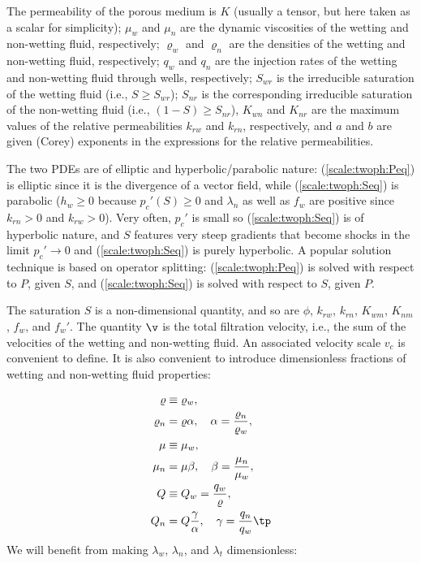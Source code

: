 \documentclass[graybox,envcountchap,sectrefs,final]{svmonodo}
\begin{document}
The permeability of the porous medium is $K$
(usually a tensor, but here taken as a
scalar for simplicity); $\mu_w$ and $\mu_n$ are the dynamic viscosities
of the wetting and non-wetting fluid, respectively;
$\varrho_w$ and $\varrho_n$ are the densities
of the wetting and non-wetting fluid, respectively;
$q_w$ and $q_n$ are the injection rates of the wetting and non-wetting
fluid through wells, respectively;
$S_{wr}$ is the irreducible saturation of
the wetting fluid (i.e., $S\geq S_{wr}$); $S_{nr}$ is the corresponding
irreducible saturation of the non-wetting fluid (i.e., $(1-S)\geq S_{nr}$),
$K_{wn}$ and $K_{nr}$ are the maximum values of the
relative permeabilities $k_{rw}$ and $k_{rn}$, respectively, and
$a$ and $b$ are given (Corey) exponents in the expressions for the
relative permeabilities.

The two PDEs are of elliptic and hyperbolic/parabolic nature:
(\ref{scale:twoph:Peq}) is elliptic since it is the divergence of a
vector field, while (\ref{scale:twoph:Seq}) is parabolic ($h_w\geq 0$
because $p_c'(S)\geq 0$ and $\lambda_n$ as well as $f_w$ are positive
since $k_{rn}>0$ and $k_{rw}>0$). Very often, $p_c'$ is small so
(\ref{scale:twoph:Seq}) is of hyperbolic nature, and $S$ features very
steep gradients that become shocks in the limit $p_c'\rightarrow 0$
and (\ref{scale:twoph:Seq}) is purely hyperbolic.
A popular solution technique is based on operator splitting:
(\ref{scale:twoph:Peq}) is solved with respect to $P$, given $S$, and
(\ref{scale:twoph:Seq}) is solved with respect to $S$, given $P$.

The saturation $S$ is a non-dimensional quantity, and so are $\phi$,
$k_{rw}$, $k_{rn}$, $K_{wm}$, $K_{nm}$, $f_w$, and $f_w'$.
The quantity $\v$ is the total filtration velocity, i.e., the
sum of the velocities of the wetting and non-wetting fluid.
An associated velocity scale $v_c$ is convenient to define.
It is also convenient to introduce dimensionless fractions of
wetting and non-wetting fluid properties:

\begin{align*}
\varrho &\equiv \varrho_w,\\ 
\varrho_n &= \varrho\alpha,\quad \alpha = \frac{\varrho_n}{\varrho_w},\\ 
\mu &\equiv\mu_w,\\ 
\mu_n &= \mu\beta,\quad \beta = \frac{\mu_n}{\mu_w},\\ 
Q &\equiv Q_w = \frac{q_w}{\varrho},\\ 
Q_n &= Q\frac{\gamma}{\alpha},\quad \gamma = \frac{q_n}{q_w}\tp
\end{align*}
We will benefit from making $\lambda_w$, $\lambda_n$, and $\lambda_t$
dimensionless:
\end{document}

